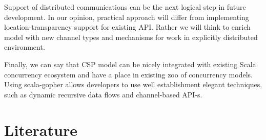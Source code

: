 \documentclass[12pt]{article}
\begin{document}
 Support of distributed communications can be the next logical step in future development. In our opinion, practical approach will differ from implementing location-transparency support for existing API. Rather we will think to enrich model with new channel types and mechanisms for work in explicitly distributed environment.

  Finally, we can say that CSP model can be nicely integrated with existing Scala concurrency ecosystem and have a place in existing zoo of concurrency models.  Using scala-gopher allows developers to use well establishment elegant techniques, such as dynamic recursive data flows and channel-based API-s. 

\section{Literature}

\printbibliography
\end{document}

